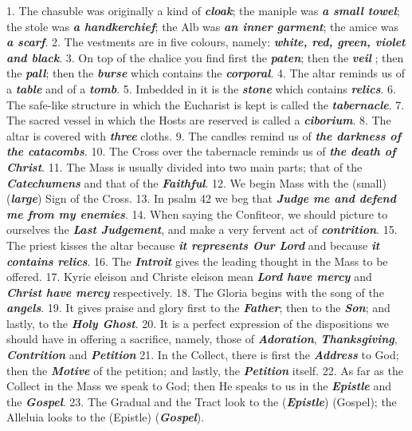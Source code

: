\documentclass[a4paper,14pt]{memoir}
\newcommand\answer[1]{\textbf{\textit{#1}}}
\begin{document}
1. The  chasuble  was  originally  a  kind  of  \answer{cloak};  the  maniple  was
\answer{a small towel}; the stole was \answer{a handkerchief};  the  Alb  was  \answer{an inner garment};  the  amice  was
\answer{a scarf}. 
2. The vestments are in five colours, namely: \answer{white, red, green, violet and black}. 
3. On  top
of the chalice you find first the \answer{paten}; then  the  \answer{veil}  ;  then  the
\answer{pall}; then the \answer{burse} which contains the \answer{corporal}. 
4. The altar  reminds
us of a \answer{table} and of a \answer{tomb}. 
5. Imbedded in it is the \answer{stone}  which
contains \answer{relics}. 
6. The safe-like structure  in  which  the  Eucharist  is
kept is called the \answer{tabernacle}. 
7. The sacred  vessel  in  which  the  Hosts  are
reserved is called a  \answer{ciborium}.  
8.  The  altar  is  covered  with  \answer{three}
cloths. 
9. The candles remind  us  of  \answer{the darkness of the catacombs}.  
10.  The  Cross  over  the
tabernacle reminds us of \answer{the death of Christ}. 
11. The Mass is usually divided into  two
main parts; that of the \answer{Catechumens} and that of the \answer{Faithful}. 
12. We  begin  Mass
with the (small) (\answer{large}) Sign of the Cross. 
13. In  psalm  42  we  beg  that
\answer{Judge me and defend me from my enemies}. 
14. When saying the Confiteor, we should picture to ourselves  the
\answer{Last Judgement}, and make a very fervent act of \answer{contrition}.  
15.  The  priest  kisses
the altar because \answer{it represents Our Lord} and because \answer{it contains relics}. 
16. The \answer{Introit} gives  the
leading thought in the Mass to be offered. 
17.  Kyrie  eleison  and  Christe
eleison mean \answer{Lord have mercy} and \answer{Christ have mercy} respectively. 
18. The Gloria begins  with
the song of the \answer{angels}. 
19.  It  gives  praise  and  glory  first  to  the
\answer{Father}; then to the \answer{Son}; and lastly, to the \answer{Holy Ghost}.  
20.  It  is  a
perfect expression  of  the  dispositions  we  should  have  in  offering  a
sacrifice, namely, those of \answer{Adoration}, \answer{Thanksgiving}, \answer{Contrition}  and  \answer{Petition}  
21.
In the Collect, there is first the \answer{Address} to God;  then  the  \answer{Motive}  of
the petition; and lastly, the \answer{Petition} itself. 
22. As far as the Collect  in
the Mass we speak to God; then He speaks to  us  in  the  \answer{Epistle}  and  the
\answer{Gospel}. 
23. The Gradual and the Tract look to the (\answer{Epistle}) (Gospel);  the
Alleluia looks to the (Epistle) (\answer{Gospel}). 
\end{document}
